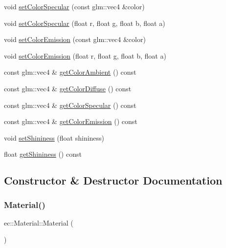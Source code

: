 \begin{DoxyCompactItemize}
\item 
void \mbox{\hyperlink{classec_1_1_material_a947f0946ff806852e1733b1e95a03489}{set\+Color\+Specular}} (const glm\+::vec4 \&color)
\item 
void \mbox{\hyperlink{classec_1_1_material_aa62e40f0571c25eb097f03c74849f918}{set\+Color\+Specular}} (float r, float g, float b, float a)
\item 
void \mbox{\hyperlink{classec_1_1_material_a77ac7702af54e4c8a7301387bea159dd}{set\+Color\+Emission}} (const glm\+::vec4 \&color)
\item 
void \mbox{\hyperlink{classec_1_1_material_a6fa0dfb1c76b2c9b07fbd2b28021010c}{set\+Color\+Emission}} (float r, float g, float b, float a)
\item 
const glm\+::vec4 \& \mbox{\hyperlink{classec_1_1_material_a68e143f6390ae7e9bc6c080853191f94}{get\+Color\+Ambient}} () const
\item 
const glm\+::vec4 \& \mbox{\hyperlink{classec_1_1_material_a6156c82b63756da91d013b5eb39fccf5}{get\+Color\+Diffuse}} () const
\item 
const glm\+::vec4 \& \mbox{\hyperlink{classec_1_1_material_a0a4a766b22c9adeffdff5c0d5140167e}{get\+Color\+Specular}} () const
\item 
const glm\+::vec4 \& \mbox{\hyperlink{classec_1_1_material_af6a4a55683956cd0b06d0a8de1dc4b9f}{get\+Color\+Emission}} () const
\item 
void \mbox{\hyperlink{classec_1_1_material_a4b9efb15466a547d4579566dfb1e558f}{set\+Shininess}} (float shininess)
\item 
float \mbox{\hyperlink{classec_1_1_material_a125ba490c4191f8f6fe77e76934ed33a}{get\+Shininess}} () const
\end{DoxyCompactItemize}


\subsection{Constructor \& Destructor Documentation}
\mbox{\label{classec_1_1_material_a259d88ca352df2d284380f0b37052652}} 
\subsubsection{\texorpdfstring{Material()}{Material()}}
{\footnotesize\ttfamily ec\+::\+Material\+::\+Material (\begin{DoxyParamCaption}{ }\end{DoxyParamCaption})\hspace{0.3cm}{\ttfamily [explicit]}}

